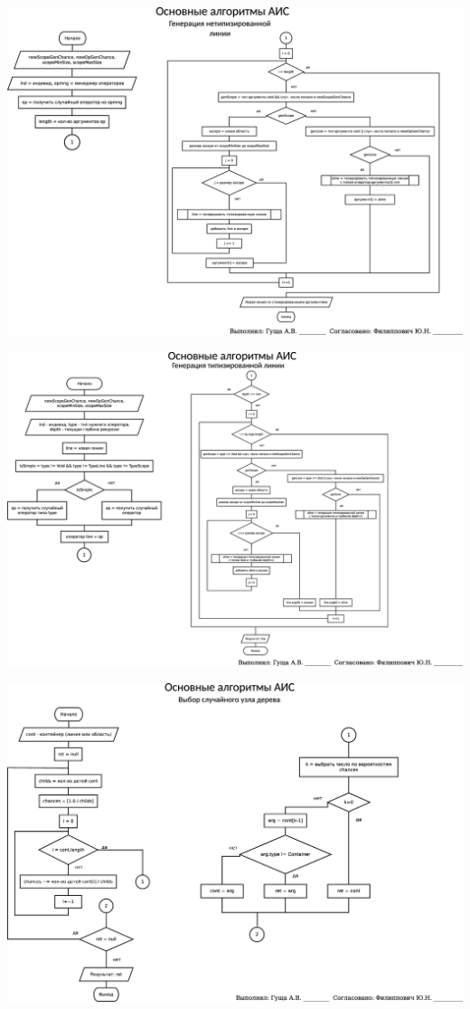 \documentclass[russian,utf8, a1paper, emptystyle]{eskdgraph}
\begin{document}
\begin{ESKDdrawing}
\includegraphics[scale=0.99]{list4_3}
\end{ESKDdrawing}

\begin{ESKDdrawing}
\includegraphics[scale=0.99]{list5_1}
\end{ESKDdrawing}

\begin{ESKDdrawing}
\includegraphics[scale=0.99]{list5_2}
\end{ESKDdrawing}
\end{document}
